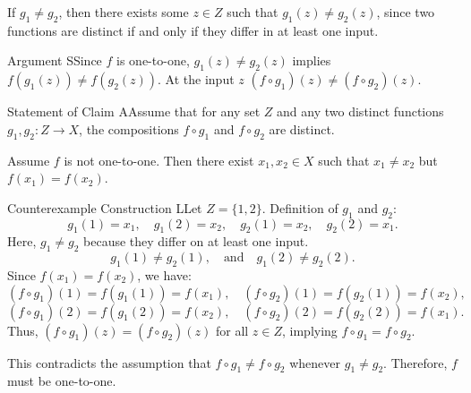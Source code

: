 \documentclass{report}
\begin{document}
\begin{keyideaWithLotus}
    If $g_1 \neq g_2$, then there exists some $z \in Z$ such that $g_1(z) \neq g_2(z)$, since two functions are distinct if and only if they differ in at least one input.
\end{keyideaWithLotus}

\begin{RemarkWithLily}{Argument}
    SSince $f$ is one-to-one, $g_1(z) \neq g_2(z)$ implies $f(g_1(z)) \neq f(g_2(z))$. At the input $z$ $(f \circ g_1)(z) \neq (f \circ g_2)(z)$. 
\end{RemarkWithLily}

\begin{ClaimWithMagnolia}{Statement of Claim}
    AAssume that for any set $Z$ and any two distinct functions $g_1, g_2: Z \to X$, the compositions $f \circ g_1$ and $f \circ g_2$ are distinct. 
\end{ClaimWithMagnolia}

\begin{keyideaWithLotus}
    Assume $f$ is not one-to-one. Then there exist $x_1, x_2 \in X$ such that $x_1 \neq x_2$ but $f(x_1) = f(x_2)$. 
\end{keyideaWithLotus}
    
\begin{RemarkWithLily}{Counterexample Construction}
    LLet $Z = \{1, 2\}$. Definition of $g_1$ and $g_2$:
    \[
    g_1(1) = x_1, \quad g_1(2) = x_2, \quad g_2(1) = x_2, \quad g_2(2) = x_1.
    \]
    Here, $g_1 \neq g_2$ because they differ on at least one input.
    \[
    g_1(1) \neq g_2(1), \quad \text{and} \quad g_1(2) \neq g_2(2).
    \]
    Since $f(x_1) = f(x_2)$, we have:
    \[
    (f \circ g_1)(1) = f(g_1(1)) = f(x_1), \quad (f \circ g_2)(1) = f(g_2(1)) = f(x_2),
    \]
    \[
    (f \circ g_1)(2) = f(g_1(2)) = f(x_2), \quad (f \circ g_2)(2) = f(g_2(2)) = f(x_1).
    \]
    Thus, $(f \circ g_1)(z) = (f \circ g_2)(z)$ for all $z \in Z$, implying $f \circ g_1 = f \circ g_2$.

    This contradicts the assumption that $f \circ g_1 \neq f \circ g_2$ whenever $g_1 \neq g_2$. Therefore, $f$ must be one-to-one.
\end{RemarkWithLily}
\end{document}
